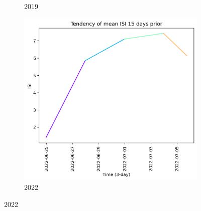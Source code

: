 \begin{figure}[h]
\begin{subfigure}{0.3\textwidth}
        \caption{2019}
        \label{fig:isi_prior_15_days_2019}
    \end{subfigure}
    \hfill
    \begin{subfigure}{0.3\textwidth}
        \centering
        \includegraphics[width=\textwidth]{graphs/15days/2022_15daysprior_tendency_graph_ISI.png}
        \caption{2022}
        \label{fig:isi_prior_15_days_2022}
    \end{subfigure}
    
    \label{fig:isi_values_15days_prior}
\end{figure}

